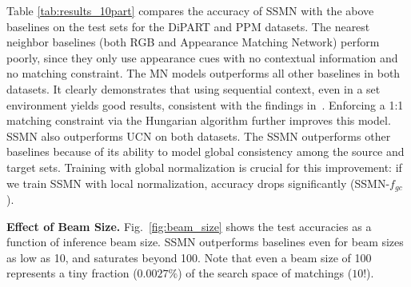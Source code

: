\documentclass[10pt,twocolumn,letterpaper]{article}
\begin{document}
Table \ref{tab:results_10part} compares the accuracy of SSMN with the above baselines on the test sets for the DiPART and PPM datasets. The nearest neighbor baselines (both RGB and Appearance Matching Network) perform poorly, since they only use appearance cues with no contextual information and no matching constraint. 
The MN models outperforms all other baselines in both datasets. It clearly demonstrates that using sequential context, even in a set environment yields good results, consistent with the findings in~\cite{vinyalsBLKW16}.
Enforcing a 1:1 matching constraint via the Hungarian algorithm further improves this model. SSMN also outperforms UCN on both datasets. The SSMN outperforms other baselines because of its ability to model global consistency among the source and target sets. Training with global normalization is crucial for this improvement: if we train SSMN with local normalization, accuracy drops significantly (SSMN-$f_{gc}$).
 

\vspace{.5em}\noindent\textbf{Effect of Beam Size.}
Fig.~\ref{fig:beam_size} shows the test accuracies as a function of inference beam size. SSMN outperforms baselines even for beam sizes as low as 10, and saturates beyond 100. Note that even a beam size of 100 represents a tiny fraction ($0.0027\%$) of the search space of matchings ($10!$).
\end{document}
